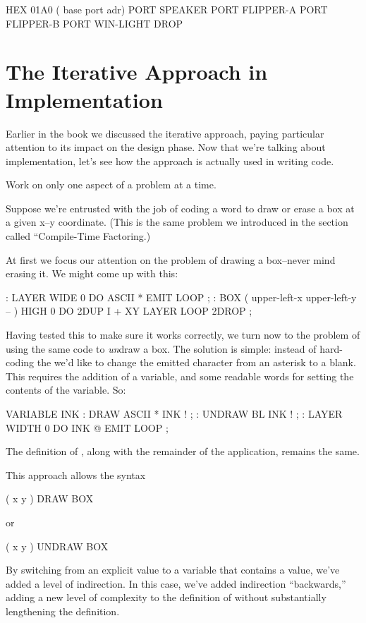 \begin{Code}
HEX 01A0  ( base port adr)
  PORT SPEAKER
  PORT FLIPPER-A
  PORT FLIPPER-B
  PORT WIN-LIGHT
DROP
\end{Code}

\section{{{{The Iterative Approach in Implementation}}}}
Earlier in the book we discussed the iterative approach, paying
particular attention to its impact on the design phase. Now that we're
talking about implementation, let's see how the approach is actually
used in writing code.

\begin{tip}
Work on only one aspect of a problem at a time.
\end{tip}
Suppose we're entrusted with the job of coding a word to draw or erase
a box at a given x--y coordinate. (This is the same problem we
introduced in the section called ``Compile-Time Factoring.)

At first we focus our attention on the problem of drawing a
box--never mind erasing it. We might come up with this:

\begin{Code}
: LAYER   WIDE  0 DO  ASCII * EMIT  LOOP ;
: BOX   ( upper-left-x  upper-left-y -- )
   HIGH  0 DO  2DUP  I +  XY LAYER  LOOP  2DROP ;
\end{Code}
Having tested this to make sure it works correctly, we turn now to the
problem of using the same code to \emph{un}draw a box. The solution is
simple: instead of hard-coding the  we'd like to change
the emitted character from an asterisk to a blank. This requires the
addition of a variable, and some readable words for setting the
contents of the variable. So:

\begin{Code}
VARIABLE INK
: DRAW   ASCII *  INK ! ;
: UNDRAW   BL  INK ! ;
: LAYER   WIDTH  0 DO  INK @  EMIT  LOOP ;
\end{Code}
The definition of , along with the remainder of the application,
remains the same.

This approach allows the syntax

\begin{Code}
( x y ) DRAW BOX
\end{Code}
or

\begin{Code}
( x y ) UNDRAW BOX
\end{Code}
By switching from an explicit value to a variable that contains a
value, we've added a level of indirection. In this case, we've added
indirection ``backwards,'' adding a new level of complexity to the
definition of  without substantially lengthening the definition.

